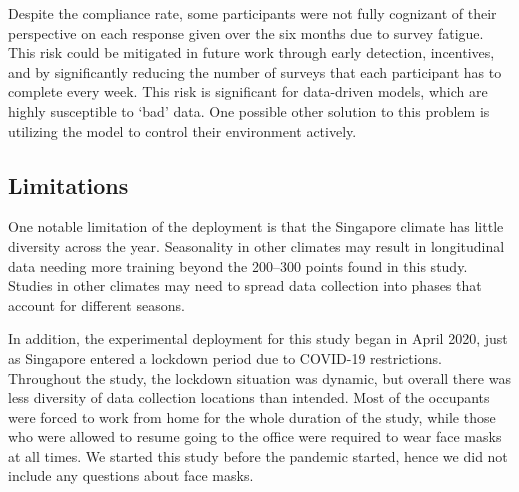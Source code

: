 Despite the compliance rate, some participants were not fully cognizant of their perspective on each response given over the six months due to survey fatigue.
This risk could be mitigated in future work through early detection, incentives, and by significantly reducing the number of surveys that each participant has to complete every week.
This risk is significant for data-driven models, which are highly susceptible to `bad' data. 
One possible other solution to this problem is utilizing the model to control their environment actively.

\subsection{Limitations}\label{subsec:limitations}
One notable limitation of the deployment is that the Singapore climate has little diversity across the year. 
Seasonality in other climates may result in longitudinal data needing more training beyond the 200--300 points found in this study.
Studies in other climates may need to spread data collection into phases that account for different seasons.

In addition, the experimental deployment for this study began in April 2020, just as Singapore entered a lockdown period due to COVID-19 restrictions. 
Throughout the study, the lockdown situation was dynamic, but overall there was less diversity of data collection locations than intended.
Most of the occupants were forced to work from home for the whole duration of the study, while those who were allowed to resume going to the office were required to wear face masks at all times.
We started this study before the pandemic started, hence we did not include any questions about face masks. 

